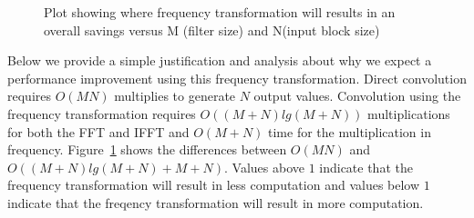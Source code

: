 \begin{figure}
\center
\epsfxsize=3.0in
\caption{Plot showing where frequency transformation will results in an overall savings versus M (filter size) and N(input block size)}
\label{fig:frequency-win}
\end{figure}


Below we provide a simple justification and analysis about why we expect a performance
improvement using this frequency transformation. Direct convolution requires $O(MN)$ multiplies
to generate $N$ output values. Convolution using the frequency transformation requires
$O((M+N)lg(M+N))$ multiplications for both the FFT and IFFT and $O(M+N)$ time for the 
multiplication in frequency. Figure~\ref{fig:frequency-win} shows the differences between
$O(MN)$ and $O((M+N)lg(M+N)+M+N)$. Values above $1$ indicate that the frequency transformation
will result in less computation and values below $1$ indicate that the freqency transformation
will result in more computation.



